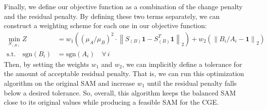 \documentclass[12pt]{article}
\begin{document}
	Finally, we define our objective function as a combination of the change penalty and the residual penalty. By defining these two terms separately, we can construct a weighting scheme for each one in our objective function:
	\begin{align*} \min_{S_{(B)}} Z &= w_1 \left( (\mu_A / \mu_B)^2 \cdot \left\| S_{(B)} \textbf{1} - S_{(B)}^T \textbf{1} \right\|_2 \right) + w_2 \left( \left\| B_{i} /A_{i} - \textbf{1} \right\|_2 \right) \\
	\text{s.t.} \quad \text{sgn} \left( B_i \right) &=  \text{sgn} \left( A_i \right)   \quad  \forall \, i 
	\end{align*}
	Then, by setting the weights $w_1$ and $w_2$, we can implicitly define a tolerance for the amount of acceptable residual penalty. That is, we can run this optimization algorithm on the original SAM and increase $w_1$ until the residual penalty falls below a desired tolerance. So, overall, this algorithm keeps the balanced SAM close to its original values while producing a feasible SAM for the CGE. 
	
	
\end{document}
